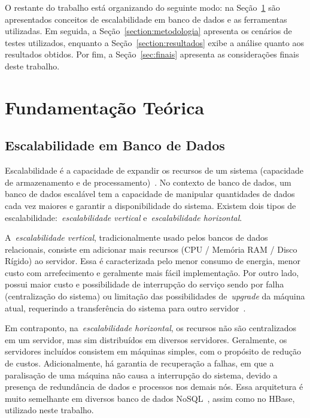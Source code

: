 \documentclass[12pt]{article}
\begin{document}
O restante do trabalho está organizando do seguinte modo: na Seção~\ref{section:fundamentacao} são apresentados conceitos de escalabilidade em banco de dados e as ferramentas utilizadas. Em seguida, a Seção~\ref{section:metodologia} apresenta os cenários de testes utilizados, enquanto a Seção~\ref{section:resultados} exibe a análise quanto aos resultados obtidos. Por fim, a Seção~\ref{sec:finais} apresenta as considerações finais deste trabalho.


\section{Fundamentação Teórica}
\label{section:fundamentacao}

\subsection{Escalabilidade em Banco de Dados}
\label{sec:escalabilidade}

Escalabilidade é a capacidade de expandir os recursos de um sistema (capacidade de armazenamento e de processamento)~\cite{elmasri2010fundamentals}. 
No contexto de banco de dados, um banco de dados escalável tem a capacidade de manipular quantidades de dados cada vez maiores e garantir a disponibilidade do sistema. 
Existem dois tipos de escalabilidade:~\emph{escalabilidade vertical} e~\emph{escalabilidade horizontal}.

A~\emph{escalabilidade vertical}, tradicionalmente usado pelos bancos de dados relacionais, consiste em adicionar mais recursos (CPU / Memória RAM / Disco Rígido) ao servidor. 
Essa é caracterizada pelo menor consumo de energia, menor custo com arrefecimento e geralmente mais fácil implementação. Por outro lado, possui maior custo e possibilidade de interrupção do serviço sendo por falha (centralização do sistema) ou limitação das possibilidades de~\emph{upgrade} da máquina atual, requerindo a transferência do sistema para outro servidor~\cite{hwang2014scale}.

Em contraponto, na~\emph{escalabilidade horizontal}, os recursos não são centralizados em um servidor, mas sim distribuídos em diversos servidores. 
Geralmente, os servidores incluídos consistem em máquinas simples, com o propósito de redução de custos.  
Adicionalmente, há garantia de recuperação a falhas, em que a paralisação de uma máquina não causa a interrupção do sistema, devido a presença de redundância de dados e processos nos demais nós.
Essa arquitetura é muito semelhante em diversos banco de dados NoSQL~\cite{hwang2014scale}, assim como no HBase, utilizado neste trabalho.
\end{document}
